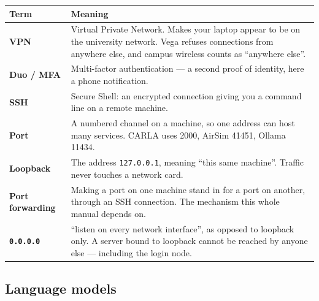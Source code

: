 \documentclass[11pt,a4paper]{article}
\begin{document}
\begin{longtable}{@{}>{\raggedright\arraybackslash}p{3.5cm} p{11.6cm}@{}}
\toprule
\textbf{Term} & \textbf{Meaning} \\
\midrule
\endhead
\textbf{VPN} & Virtual Private Network. Makes your laptop appear to be on the
university network. Vega refuses connections from anywhere else, and campus
wireless counts as ``anywhere else''. \\
\textbf{Duo / MFA} & Multi-factor authentication --- a second proof of identity,
here a phone notification. \\
\textbf{SSH} & Secure Shell: an encrypted connection giving you a command line
on a remote machine. \\
\textbf{Port} & A numbered channel on a machine, so one address can host many
services. CARLA uses 2000, AirSim 41451, Ollama 11434. \\
\textbf{Loopback} & The address \texttt{127.0.0.1}, meaning ``this same
machine''. Traffic never touches a network card. \\
\textbf{Port forwarding} & Making a port on one machine stand in for a port on
another, through an SSH connection. The mechanism this whole manual depends on.
\\
\textbf{\texttt{0.0.0.0}} & ``listen on every network interface'', as opposed to
loopback only. A server bound to loopback cannot be reached by anyone else ---
including the login node. \\
\bottomrule
\end{longtable}

\subsection{Language models}
\end{document}
